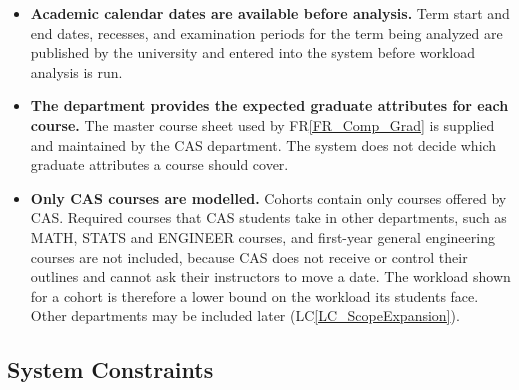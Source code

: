 \documentclass[12pt]{article}
\newcommand{\rref}[1]{FR\ref{#1}}
\newcommand{\lcref}[1]{LC\ref{#1}}
\newcounter{asnum} %
\begin{document}
\begin{itemize}
\item[A\refstepcounter{asnum}\theasnum \label{A_AcademicCalendar}:]
  \textbf{Academic calendar dates are available before analysis.} Term start
  and end dates, recesses, and examination periods for the term being analyzed
  are published by the university and entered into the system before
  workload analysis is run.

\item[A\refstepcounter{asnum}\theasnum \label{A_MasterSheet}:] \textbf{The
  department provides the expected graduate attributes for each course.} The
  master course sheet used by \rref{FR_Comp_Grad} is supplied and maintained
  by the CAS department. The system does not decide which graduate attributes
  a course should cover.

\item[A\refstepcounter{asnum}\theasnum \label{A_CASCoursesOnly}:] \textbf{Only
  CAS courses are modelled.} Cohorts contain only courses offered by CAS.
  Required courses that CAS students take in other departments, such as MATH,
  STATS and ENGINEER courses, and first-year general engineering courses are
  not included, because CAS does not receive or control their outlines and
  cannot ask their instructors to move a date. The workload shown for a cohort
  is therefore a lower bound on the workload its students face. Other
  departments may be included later (\lcref{LC_ScopeExpansion}).

\end{itemize}

\subsection{System Constraints}
\end{document}

